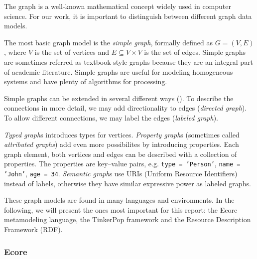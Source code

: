 The graph is a well-known mathematical concept widely used in computer science. For our work, it is important to distinguish between different graph data models.


The most basic graph model is the \emph{simple graph}, formally defined as $G = (V, E)$, where $V$ is the set of vertices and $E \subseteq V \times V$ is the set of edges. Simple graphs are sometimes referred as textbook-style graphs because they are an integral part of academic literature. Simple graphs are useful for modeling homogeneous systems and have plenty of algorithms for processing.

Simple graphs can be extended in several different ways (). To describe the connections in more detail, we may add directionality to edges (\emph{directed graph}). To allow different connections, we may label the edges (\emph{labeled graph}). 

\emph{Typed graph}s introduces types for vertices. \emph{Property graph}s (sometimes called \emph{attributed graphs}) add even more possibilites by introducing properties. Each graph element, both vertices and edges can be described with a collection of properties. The properties are key--value pairs, e.g. \texttt{type = 'Person'}, \texttt{name = 'John'}, \texttt{age = 34}. \emph{Semantic graph}s use URIs (Uniform Resource Identifiers) instead of labels, otherwise they have similar expressive power as labeled graphs. 


These graph models are found in many languages and environments. In the following, we will present the ones most important for this report: the Ecore metamodeling language, the TinkerPop framework and the Resource Description Framework (RDF).




\subsubsection{Ecore}
\label{ecore}

